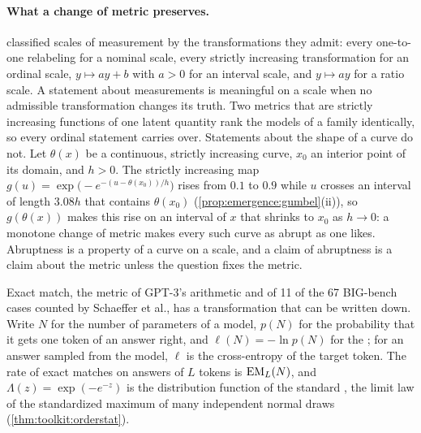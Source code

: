 \begin{refsection}
\paragraph{What a change of metric preserves.} \Textcite{Stevens1946} classified scales of measurement by the transformations they admit: every one-to-one relabeling for a nominal scale, every strictly increasing transformation for an ordinal scale, $y\mapsto ay+b$ with $a>0$ for an interval scale, and $y\mapsto ay$ for a ratio scale. A statement about measurements is meaningful on a scale when no admissible transformation changes its truth. Two metrics that are strictly increasing functions of one latent quantity rank the models of a family identically, so every ordinal statement carries over. Statements about the shape of a curve do not. Let $\theta(x)$ be a continuous, strictly increasing curve, $x_0$ an interior point of its domain, and $h>0$. The strictly increasing map $g(u)=\exp\bigl(-e^{-(u-\theta(x_0))/h}\bigr)$ rises from $0.1$ to $0.9$ while $u$ crosses an interval of length $3.08h$ that contains $\theta(x_0)$ (\cref{prop:emergence:gumbel}(ii)), so $g(\theta(x))$ makes this rise on an interval of $x$ that shrinks to $x_0$ as $h\to0$: a monotone change of metric makes every such curve as abrupt as one likes. Abruptness is a property of a curve on a scale, and a claim of abruptness is a claim about the metric unless the question fixes the metric.

Exact match, the metric of GPT-3's arithmetic and of 11 of the 67 BIG-bench cases counted by Schaeffer et al., has a transformation that can be written down. Write $N$ for the number of parameters of a model, $p(N)$ for the probability that it gets one token of an answer right, and $\ell(N)=-\ln p(N)$ for the ; for an answer sampled from the model, $\ell$ is the cross-entropy of the target token. The rate of exact matches on answers of $L$ tokens is $\mathrm{EM}_L(N)$, and $\Lambda(z)=\exp(-e^{-z})$ is the distribution function of the standard , the limit law of the standardized maximum of many independent normal draws (\cref{thm:toolkit:orderstat}).


\end{refsection}
